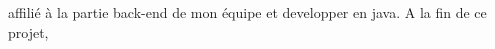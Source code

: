 \documentclass[a4paper, 11pt, french]{report}
\begin{document}
                                                                                                                                   affilié
                                                                                                                                   à
                                                                                                                                   la
                                                                                                                                   partie
                                                                                                                                   back-end
                                                                                                                                   de
                                                                                                                                   mon
                                                                                                                                   équipe
                                                                                                                                   et
                                                                                                                                   developper
                                                                                                                                   en
                                                                                                                                   java.
                                                                                                                                   \newline
                                                                                                                                   A
                                                                                                                                   la
                                                                                                                                   fin
                                                                                                                                   de
                                                                                                                                   ce
                                                                                                                                   projet,
\end{document}
